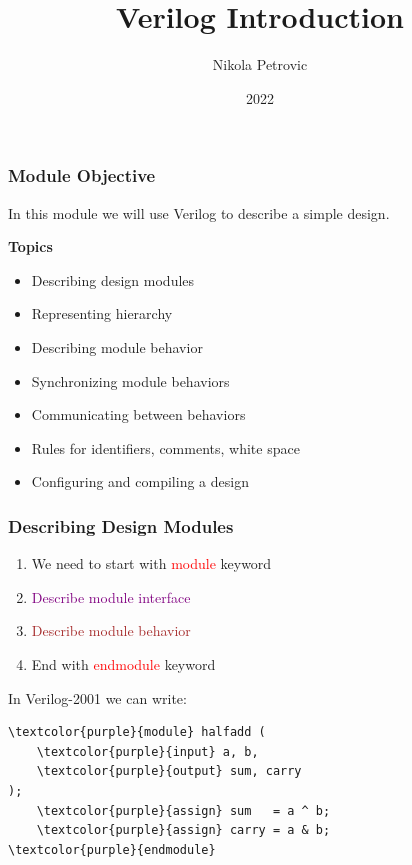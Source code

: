 \documentclass[t]{beamer}
\title{Verilog Introduction}
\author{Nikola Petrovic}
\institute{University of Belgrade, School of Electrical Engineering}
\date{2022}
\begin{document}
\frame{\titlepage}

\begin{frame}
\frametitle{Module Objective}

In this module we will use Verilog to describe a simple design.
\newline

\textbf{Topics}

\begin{itemize}
\item Describing design modules
\item Representing hierarchy
\item Describing module behavior
\item Synchronizing module behaviors
\item Communicating between behaviors
\item Rules for identifiers, comments, white space
\item Configuring and compiling a design
\end{itemize}

\end{frame}

\begin{frame}[fragile]
\frametitle{Describing Design Modules}

\begin{enumerate}
\item We need to start with \textcolor{red}{module} keyword
\item \textcolor{purple}{Describe module interface}
\item \textcolor{brown}{Describe module behavior}
\item End with \textcolor{red}{endmodule} keyword
\end{enumerate}

In Verilog-2001 we can write:
\newline

\begin{Verbatim}[commandchars=\\\{\}, tabsize=2]
\textcolor{purple}{module} halfadd (
	\textcolor{purple}{input} a, b,
	\textcolor{purple}{output} sum, carry
);
	\textcolor{purple}{assign} sum   = a ^ b;
	\textcolor{purple}{assign} carry = a & b;
\textcolor{purple}{endmodule}
\end{Verbatim}

\end{frame}
\end{document}
